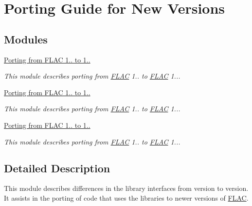 \hypertarget{group__porting}{}\section{Porting Guide for New Versions}
\label{group__porting}
\subsection*{Modules}
\begin{DoxyCompactItemize}
\item 
\hyperlink{group__porting__1__1__2__to__1__1__3}{Porting from F\+L\+A\+C 1.. to 1..}
\begin{DoxyCompactList}\small\item\em This module describes porting from \hyperlink{namespace_f_l_a_c}{F\+L\+AC} 1.. to \hyperlink{namespace_f_l_a_c}{F\+L\+AC} 1... \end{DoxyCompactList}\item 
\hyperlink{group__porting__1__1__3__to__1__1__4}{Porting from F\+L\+A\+C 1.. to 1..}
\begin{DoxyCompactList}\small\item\em This module describes porting from \hyperlink{namespace_f_l_a_c}{F\+L\+AC} 1.. to \hyperlink{namespace_f_l_a_c}{F\+L\+AC} 1... \end{DoxyCompactList}\item 
\hyperlink{group__porting__1__1__4__to__1__2__0}{Porting from F\+L\+A\+C 1.. to 1..}
\begin{DoxyCompactList}\small\item\em This module describes porting from \hyperlink{namespace_f_l_a_c}{F\+L\+AC} 1.. to \hyperlink{namespace_f_l_a_c}{F\+L\+AC} 1... \end{DoxyCompactList}\end{DoxyCompactItemize}


\subsection{Detailed Description}
This module describes differences in the library interfaces from version to version. It assists in the porting of code that uses the libraries to newer versions of \hyperlink{namespace_f_l_a_c}{F\+L\+AC}.


